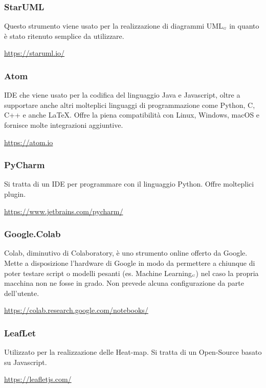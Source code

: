 \subsubsection{StarUML}\label{ProcessiPrimariStrumentiDrawIo}
Questo strumento viene usato per la realizzazione di diagrammi UML$_{\scaleto{G}{3pt}}$ in quanto è stato ritenuto semplice da utilizzare.
\begin{center}
	\url{https://staruml.io/}
\end{center}
\subsubsection{Atom}\label{ProcessiPrimariStrumentiAtom}
IDE che viene usato per la codifica del linguaggio Java e Javascript, oltre a supportare anche altri molteplici linguaggi di programmazione come Python, C, C++ e anche \LaTeX. Offre la piena compatibilità con Linux, Windows, macOS e fornisce molte integrazioni aggiuntive.
\begin{center}
	\url{https://atom.io}
\end{center}
\subsubsection{PyCharm}\label{ProcessiPrimariStrumentiPyCharm}
Si tratta di un IDE per programmare con il linguaggio Python.
Offre molteplici plugin.
\begin{center}
	\url{https://www.jetbrains.com/pycharm/}
\end{center}
\subsubsection{Google.Colab}\label{ProcessiPrimariStrumentiGoogleColab}
Colab, diminutivo di Colaboratory, è uno strumento online offerto da Google.
Mette a disposizione l'hardware di Google in modo da permettere a chiunque di poter testare script o modelli pesanti (es. Machine Learning$_{\scaleto{G}{3pt}}$) nel caso la propria macchina non ne fosse in grado.
Non prevede alcuna configurazione da parte dell'utente.
\begin{center}
	\url{https://colab.research.google.com/notebooks/}
\end{center}
\subsubsection{LeafLet}\label{ProcessiPrimariStrumentiLeafLet}
Utilizzato per la realizzazione delle Heat-map.
Si tratta di un Open-Source basato su Javascript.
\begin{center}
	\url{https://leafletjs.com/}
\end{center}
